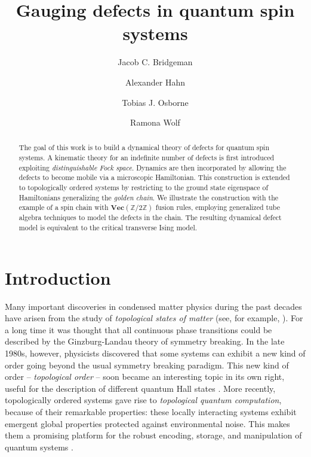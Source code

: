 \documentclass[aps,prx,twocolumn,superscriptaddress,noshowkeys]{revtex4-2}  %
\renewcommand{\Vec}{\textbf{Vec}}
\newcommand{\Z}{\mathbb{Z}}
\theoremstyle{plain}%
\theoremstyle{definition}
\theoremstyle{remark}
\begin{document}
\title{Gauging defects in quantum spin systems}


\author{Jacob C. Bridgeman}
\author{Alexander Hahn}
\author{Tobias J. Osborne}
\author{Ramona Wolf}

                            

\begin{abstract}
The goal of this work is to build a dynamical theory of defects for quantum spin systems. A kinematic theory for an indefinite number of defects is first introduced exploiting \emph{distinguishable Fock space}. Dynamics are then incorporated by allowing the defects to become mobile via a microscopic Hamiltonian. This construction is extended to topologically ordered systems by restricting to the ground state eigenspace of Hamiltonians generalizing the \emph{golden chain}. We illustrate the construction with the example of a spin chain with $\Vec(\Z/2\Z)$ fusion rules, employing generalized tube algebra techniques to model the defects in the chain. The resulting dynamical defect model is equivalent to the critical transverse Ising model.
\end{abstract}


\maketitle

\section{Introduction}
Many important discoveries in condensed matter physics during the past decades have arisen from the study of \emph{topological states of matter} (see, for example, \cite{Wen07,NSSFD08,HK10,QZ11}). For a long time it was thought that all continuous phase transitions could be described by the Ginzburg-Landau theory of symmetry breaking. In the late 1980s, however, physicists discovered that some systems can exhibit a new kind of order going beyond the usual symmetry breaking paradigm. This new kind of order -- \emph{topological order} \cite{Wen90} -- soon became an interesting topic in its own right, useful for the description of different quantum Hall states \cite{WN90}. More recently, topologically ordered systems gave rise to \emph{topological quantum computation}, because of their remarkable properties: these locally interacting systems exhibit emergent global properties protected against environmental noise. This makes them a promising platform for the robust encoding, storage, and manipulation of quantum systems \cite{DKLP2002,Kit03,NSSFD08,Ter15,PY15,BLPSW16}.
\end{document}
